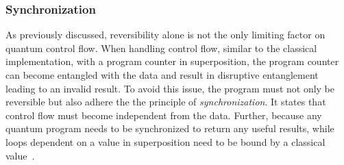 \subsubsection{Synchronization}
\label{sec:background_controlflow_synchronization}
As previously discussed, reversibility alone is not the only limiting factor on quantum control flow. When handling control flow, similar to the classical implementation, with a program counter in superposition, the program counter can become entangled with the data and result in disruptive entanglement leading to an invalid result. To avoid this issue, the program must not only be reversible but also adhere the the principle of \emph{synchronization}. It states that control flow must become independent from the data. Further, because any quantum program needs to be synchronized to return any useful results, while loops dependent on a value in superposition need to be bound by a classical value~\cite{YVC24}.  
